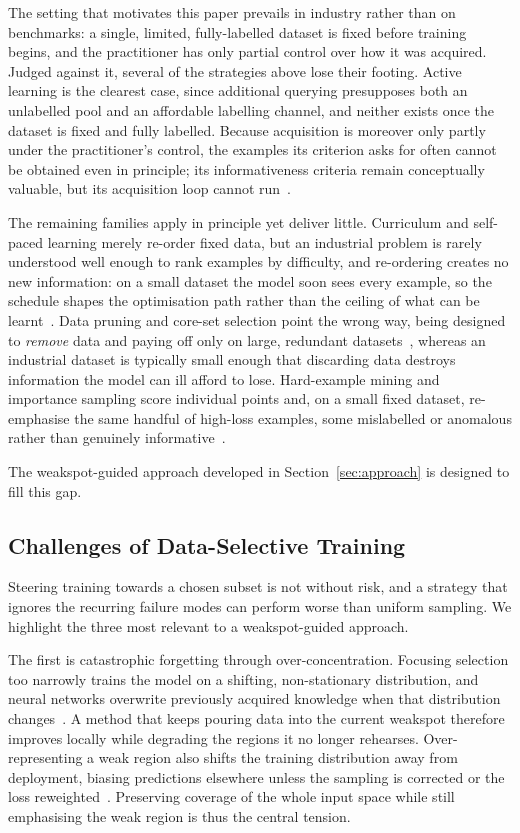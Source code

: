 \documentclass[conference]{IEEEtran}
\begin{document}
The setting that motivates this paper prevails in industry rather than on benchmarks:
a single, limited, fully-labelled dataset is fixed before training begins, and the
practitioner has only partial control over how it was acquired. Judged against it,
several of the strategies above lose their footing. Active learning is the clearest
case, since additional querying presupposes both an unlabelled pool and an affordable labelling channel, and neither exists once the dataset is fixed and fully labelled.
Because acquisition is moreover only partly under the practitioner's control, the
examples its criterion asks for often cannot be obtained even in principle; its
informativeness criteria remain conceptually valuable, but its acquisition loop cannot
run~\cite{settles2009,farquhar2021}.

The remaining families apply in principle yet deliver little. Curriculum and self-paced
learning merely re-order fixed data, but an industrial problem is rarely understood well
enough to rank examples by difficulty, and re-ordering creates no new information: on a
small dataset the model soon sees every example, so the schedule shapes the optimisation
path rather than the ceiling of what can be learnt~\cite{bengio2009,kumar2010}. Data
pruning and core-set selection point the wrong way, being designed to \emph{remove} data
and paying off only on large, redundant datasets~\cite{sorscher2022}, whereas an
industrial dataset is typically small enough that discarding data destroys information
the model can ill afford to lose. Hard-example mining and importance sampling score
individual points and, on a small fixed dataset, re-emphasise the same handful of
high-loss examples, some mislabelled or anomalous rather than genuinely
informative~\cite{shrivastava2016,mindermann2022}.

The weakspot-guided approach developed in
Section~\ref{sec:approach} is designed to fill this gap.

\subsection{Challenges of Data-Selective Training}
\label{sec:challenges}

Steering training towards a chosen subset is not without risk, and a strategy that
ignores the recurring failure modes can perform worse than uniform sampling. We
highlight the three most relevant to a weakspot-guided approach.

The first is catastrophic forgetting through over-concentration. Focusing selection too
narrowly trains the model on a shifting, non-stationary distribution, and neural networks
overwrite previously acquired knowledge when that distribution
changes~\cite{mccloskey1989,kirkpatrick2017}. A method that keeps pouring data into the
current weakspot therefore improves locally while degrading the regions it no longer
rehearses. Over-representing a weak region also shifts the training distribution away
from deployment, biasing predictions elsewhere unless the sampling is corrected or the
loss reweighted~\cite{farquhar2021,katharopoulos2018}. Preserving coverage of the whole
input space while still emphasising the weak region is thus the central tension.
\end{document}

